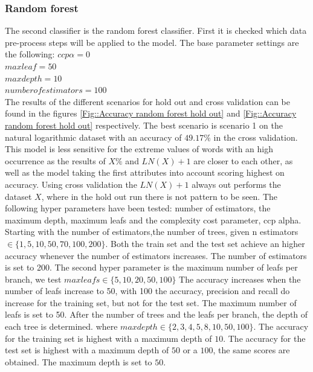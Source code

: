 \documentclass[11pt]{article}
\begin{document}
\subsubsection{Random forest}
The second classifier is the random forest classifier. First it is checked which data pre-process steps will be applied to the model. The base parameter settings are the following:
$ccp \alpha = 0$ \\
$max leaf = 50$ \\
$max depth = 10$ \\
$number of estimators = 100$\\
The results of the different scenarios for hold out and cross validation can be found in the figures \ref{Fig::Accuracy random forest hold out} and \ref{Fig::Accuracy random forest hold out} respectively. The best scenario is scenario 1 on the natural logarithmic dataset with an accuracy of $49.17\%$ in the cross validation. This model is less sensitive for the extreme values of words with an high occurrence as the results of $X\%$ and $LN(X)+1$ are closer to each other, as well as the model taking the first attributes into account scoring highest on accuracy. Using cross validation the $LN(X)+1$ always out performs the dataset $X$, where in the hold out run there is not pattern to be seen. 
\newline
The following hyper parameters have been tested: number of estimators, the maximum depth, maximum leafs and the complexity cost parameter, ccp alpha. Starting with the number of estimators,the number of trees, given n estimators $\in \{1,5,10,50,70, 100, 200\}$. 
\newline
Both the train set and the test set achieve an higher accuracy whenever the number of estimators increases. The number of estimators is set to 200.
The second hyper parameter is the maximum number of leafs per branch, we test $max leafs \in \{5,10, 20, 50, 100\}$ The accuracy increases when the number of leafs increase to 50, with 100 the accuracy, precision and recall do increase for the training set, but not for the test set. The maximum number of leafs is set to 50.   
\newline
After the number of trees and the leafs per branch, the depth of each tree is determined. where $max depth \in \{2, 3, 4, 5, 8, 10, 50, 100\}$. The accuracy for the training set is highest with a maximum depth of $10$. The accuracy for the test set is highest with a maximum depth of $50$ or a $100$, the same scores are obtained. The maximum depth is set to $50$. 
\newline
\end{document}
